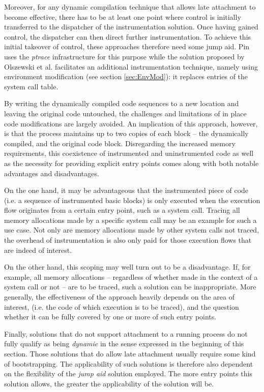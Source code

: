 Moreover, for any dynamic compilation technique that allows late attachment
to become effective, there 
has to be at least one point where control is initially transferred to 
the dispatcher of the instrumentation solution. Once having gained control, 
the dispatcher can then direct further instrumentation. To achieve
this initial takeover of control, these approaches therefore need some jump aid. Pin
uses the \emph{ptrace} infrastructure for this purpose while the solution proposed
by Olszewski et al. facilitates an additional instrumentation technique, namely using 
environment modification (see section \ref{sec:EnvMod}): it replaces entries of the system 
call table.

By writing the dynamically compiled code sequences to a new location and leaving
the original code untouched, the challenges and limitations of in place code 
modifications are largely avoided. An implication of this approach, however,
is that the process maintains up to two copies of each block -- 
the dynamically compiled, and the original code block. Disregarding the increased 
memory requirements, this coexistence of instrumented and uninstrumented 
code as well as the necessity for providing explicit entry points comes along with both 
notable advantages and disadvantages.

On the one hand, it may be advantageous that the instrumented piece of code 
(i.e. a sequence of instrumented basic blocks) is only executed when the execution flow originates
from a certain entry point, such as a system call. Tracing all memory allocations made by a specific 
system call may be an example for such a use case. Not only are memory allocations 
made by other system calls not traced, the overhead of instrumentation is also only
paid for those execution flows that are indeed of interest.

On the other hand, this scoping may well turn out to be a disadvantage. If, for example,
all memory allocations -- regardless of whether made in the context of a system call
or not -- are to be traced, such a solution can be inappropriate. More generally,
the effectiveness of the approach heavily depends on the area of interest,
(i.e. the code of which execution is to be traced), and the question whether it
can be fully covered by one or more of such entry points. 

Finally, solutions that do not support attachment to a running process do not 
fully qualify as being \emph{dynamic} in the sense expressed in the beginning
of this section. Those solutions that do allow late attachment usually require
some kind of bootstrapping. The applicability of such solutions 
is therefore also dependent on the flexibility of the \emph{jump aid} solution employed. 
The more entry points this solution allows, the greater the applicability 
of the solution will be. 


